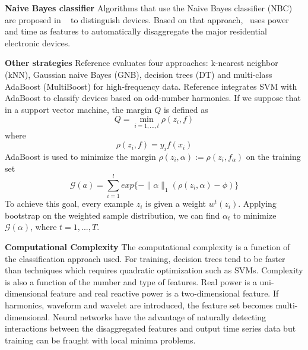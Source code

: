 \textbf{Naive Bayes classifier}
Algorithms that use the Naive Bayes classifier (NBC) are proposed in ~\cite{zeifman2012disaggregation} to distinguish devices. 
Based on that approach,~\cite{zeifman2013automatic} uses power and time as features to automatically disaggregate the major residential electronic devices. 

\textbf{Other strategies}
Reference \cite{berges2009learning} evaluates four approaches:
k-nearest neighbor (kNN), Gaussian naive Bayes (GNB),
decision trees (DT) and multi-class AdaBoost (MultiBoost)
for high-frequency data.
Reference \cite{onoda2000applying} integrates SVM with AdaBoost to classify devices
based on odd-number harmonics.
If we suppose that in a support vector machine,
the margin $Q$ is defined as
\begin{equation}
Q= \min_{i=1,...,l}\rho(z_i,f)
\end{equation}
where
\begin{equation}
\rho(z_i,f)= y_i f(x_i)
\end{equation}
AdaBoost is used to minimize the margin
$\rho(z_i,\alpha):=\rho(z_i, f_\alpha)$ on the training set
\begin{equation}
\mathscr{G}(a)= \sum_{i=1}^l exp\{-\lVert \alpha \rVert_1 (\rho(z_i, \alpha)-\phi)\}
\end{equation}
To achieve this goal, every example $z_i$ is
given a weight $w^t(z_i)$.
Applying bootstrap on the weighted sample distribution,
we can find $\alpha_t$ to minimize $\mathscr{G}(\alpha)$, 
where $t=1,...,T$. 


\textbf{Computational Complexity}
The computational complexity is a function of the classification approach used. 
For training, decision trees tend to be faster than 
techniques which requires quadratic optimization such as SVMs. 
Complexity is also a function of the number and type of features.
Real power is a uni-dimensional feature and real reactive power is a two-dimensional feature. 
If harmonics, waveform and wavelet are introduced, the feature
set becomes multi-dimensional.
Neural networks have the advantage of naturally
detecting interactions between the disaggregated features and output 
time series data but training can be fraught with local minima problems.


